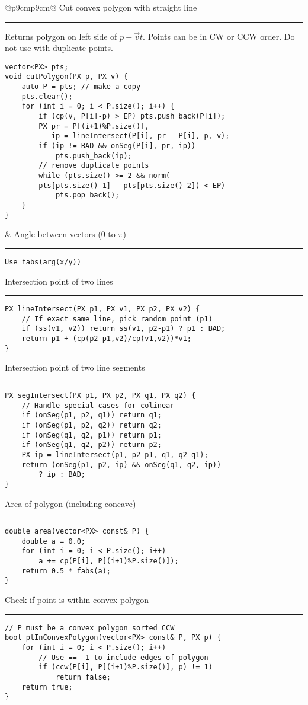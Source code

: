 \documentclass[letterpaper]{article}
\newcommand{\rx}[1]{#1\hrule}
\begin{document}
\begin{tabular}{@{}p{9cm}p{9cm}@{}}
\rx{Cut convex polygon with straight line}
\vspace{1mm}
Returns polygon on left side of $p+\vec vt$. Points can be in CW or CCW order. Do not use with duplicate points.
\begin{lstlisting}
vector<PX> pts;
void cutPolygon(PX p, PX v) {
	auto P = pts; // make a copy
	pts.clear();
	for (int i = 0; i < P.size(); i++) {
		if (cp(v, P[i]-p) > EP) pts.push_back(P[i]);
		PX pr = P[(i+1)%P.size()],
		   ip = lineIntersect(P[i], pr - P[i], p, v);
		if (ip != BAD && onSeg(P[i], pr, ip))
			pts.push_back(ip);
		// remove duplicate points
		while (pts.size() >= 2 && norm(
		pts[pts.size()-1] - pts[pts.size()-2]) < EP)
			pts.pop_back();
	}
}
\end{lstlisting}
&
\rx{Angle between vectors ($0$ to $\pi$)}
\begin{lstlisting}
Use fabs(arg(x/y))
\end{lstlisting}
\rx{Intersection point of two lines}
\begin{lstlisting}
PX lineIntersect(PX p1, PX v1, PX p2, PX v2) {
	// If exact same line, pick random point (p1)
	if (ss(v1, v2)) return ss(v1, p2-p1) ? p1 : BAD; 
	return p1 + (cp(p2-p1,v2)/cp(v1,v2))*v1;
}
\end{lstlisting}
\rx{Intersection point of two line segments}
\begin{lstlisting}
PX segIntersect(PX p1, PX p2, PX q1, PX q2) {
	// Handle special cases for colinear
	if (onSeg(p1, p2, q1)) return q1;
	if (onSeg(p1, p2, q2)) return q2;
	if (onSeg(q1, q2, p1)) return p1;
	if (onSeg(q1, q2, p2)) return p2;
	PX ip = lineIntersect(p1, p2-p1, q1, q2-q1);
	return (onSeg(p1, p2, ip) && onSeg(q1, q2, ip))
		? ip : BAD;
}
\end{lstlisting}
\rx{Area of polygon (including concave)}
\begin{lstlisting}
double area(vector<PX> const& P) {
	double a = 0.0;
	for (int i = 0; i < P.size(); i++)
		a += cp(P[i], P[(i+1)%P.size()]);
	return 0.5 * fabs(a);
}
\end{lstlisting}
\rx{Check if point is within convex polygon}
\begin{lstlisting}
// P must be a convex polygon sorted CCW
bool ptInConvexPolygon(vector<PX> const& P, PX p) {
	for (int i = 0; i < P.size(); i++)
		// Use == -1 to include edges of polygon
		if (ccw(P[i], P[(i+1)%P.size()], p) != 1)
			return false;
	return true;
}
\end{lstlisting}
\end{tabular}
\end{document}
